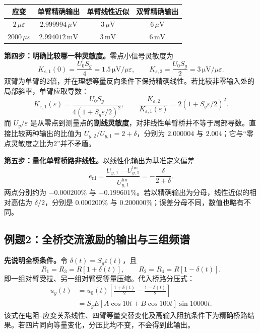 \begin{table}[H]
\centering\small
\begin{tabular}{@{}c c c c@{}}
\toprule
应变 & 单臂精确输出 & 单臂线性近似 & 双臂精确输出 \\
\midrule
$2\,\mu\varepsilon$ & $2.999994\,\mu\mathrm V$ & $3\,\mu\mathrm V$ & $6\,\mu\mathrm V$ \\
$2000\,\mu\varepsilon$ & $2.994012\,\mathrm{mV}$ & $3\,\mathrm{mV}$ & $6\,\mathrm{mV}$ \\
\bottomrule
\end{tabular}
\end{table}

\textbf{第四步：明确比较哪一种灵敏度。}零点小信号灵敏度为
\[
K_{\varepsilon,1}(0)=\frac{U_0S_g}{4}
=1.5\,\mathrm{\mu V}/\mu\varepsilon,
\qquad
K_{\varepsilon,2}=\frac{U_0S_g}{2}
=3\,\mathrm{\mu V}/\mu\varepsilon.
\]
双臂为单臂的2倍，并在理想等量反向条件下保持精确线性。若比较非零输入处的局部斜率，单臂应取导数：
\[
K_{\varepsilon,1}(\varepsilon)
=\frac{U_0S_g}{4(1+S_g\varepsilon/2)^2},\qquad
\frac{K_{\varepsilon,2}}{K_{\varepsilon,1}(\varepsilon)}
=2(1+S_g\varepsilon/2)^2.
\]
而 $U_y/\varepsilon$ 是从零点到测量点的\textbf{割线灵敏度}，对非线性单臂桥并不等于局部导数。直接比较两种输出的比值为 $U_{y,2}/U_{y,1}=2+\delta$，分别为 $2.000004$ 与 $2.004$；它与“零点灵敏度之比为2”并不矛盾。

\textbf{第五步：量化单臂桥路非线性。}以线性化输出为基准定义偏差
\[
e_{\mathrm{nl}}=\frac{U_{y,1}-U_{y,1}^{\mathrm{lin}}}{U_{y,1}^{\mathrm{lin}}}
=-\frac{\delta}{2+\delta}.
\]
两点分别约为 $-0.000200\%$ 与 $-0.199601\%$。若以精确输出为分母，线性近似的相对高估为 $\delta/2$，分别是 $0.000200\%$ 与 $0.200000\%$；误差分母不同，数值也略有不同。


\Needspace{8cm}
\subsection{例题2：全桥交流激励的输出与三组频谱}


\sol
\textbf{先说明全桥条件。}令 $\delta(t)=S_g\varepsilon(t)$，且
\[
R_1=R_3=R[1+\delta(t)],\qquad
R_2=R_4=R[1-\delta(t)].
\]
即一组对臂受拉、另一组对臂受等量压缩。代入桥路分压式：
\begin{align*}
u_y(t)&=u_0(t)\left[\frac{1+\delta(t)}2-\frac{1-\delta(t)}2\right]\\
&=\boxed{S_gE[A\cos10t+B\cos100t]\sin10000t}.
\end{align*}
该式在电阻--应变关系线性、四臂等量交替变化及高输入阻抗条件下为精确桥路结果。若四片同向等量变化，分压比均不变，不会得到此输出。

